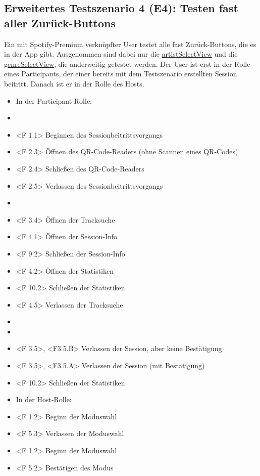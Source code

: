 \documentclass[oneside, ngerman]{sdqtechreport}
\begin{document}
\subsection{Erweitertes Testszenario 4 (E4): Testen fast aller Zurück-Buttons}
\label{subsec:Tests:ErweiterteTestszenarien:E4}
Ein mit Spotify-Premium verknüpfter User testet alle fast Zurück-Buttons, die es in der App gibt. Ausgenommen sind dabei nur die \hyperlink{artistSelectView}{artistSelectView} und die \hyperlink{genreSelectView}{genreSelectView}, die anderweitig getestet werden. Der User ist erst in der Rolle eines Participants, der einer bereits mit dem Testszenario \gOne erstellten Session beitritt. Danach ist er in der Rolle des Hosts.
\begin{itemize}
    \item In der Participant-Rolle:
    \item \gNine
    \item <F 1.1> Beginnen des Sessionbeitrittsvorgangs
    \item <F 2.3> Öffnen des QR-Code-Readers (ohne Scannen eines QR-Codes)
    \item <F 2.4> Schließen des QR-Code-Readers
    \item <F 2.5> Verlassen des Sessionbeitrittsvorgangs
    \item \gTwo
    \item <F 3.4> Öffnen der Tracksuche
    \item <F 4.1> Öffnen der Session-Info
    \item <F 9.2> Schließen der Session-Info
    \item <F 4.2> Öffnen der Statistiken
    \item <F 10.2> Schließen der Statistiken
    \item <F 4.5> Verlassen der Tracksuche
    \item \gTen
    \item \gEleven
    \item <F 3.5>, <F3.5.B> Verlassen der Session, aber keine Bestätigung
    \item <F 3.5>, <F3.5.A> Verlassen der Session (mit Bestätigung)
    \item <F 10.2> Schließen der Statistiken
    \item In der Host-Rolle:
    \item <F 1.2> Beginn der Moduswahl
    \item <F 5.3> Verlassen der Moduswahl
    \item <F 1.2> Beginn der Moduswahl
    \item <F 5.2> Bestätigen des Modus

\end{itemize}
\end{document}
